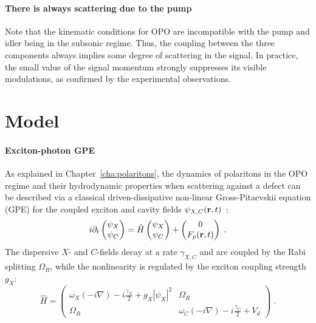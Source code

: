 \paragraph{There is always scattering due to the pump}
Note that the kinematic conditions for OPO are incompatible with the
pump and idler being in the subsonic regime. Thus, the coupling
between the three components always implies some degree of scattering
in the signal. In practice, the small value of the signal momentum
strongly suppresses its visible modulations, as confirmed by the
experimental observations.

\section{Model}
\label{sec:model-opo}

\paragraph{Exciton-photon GPE}
As explained in Chapter~\ref{cha:polaritons}, the dynamics of
polaritons in the OPO regime and their hydrodynamic properties when
scattering against a defect can be described via a classical
driven-dissipative non-linear Gross-Pitaevskii equation (GPE) for the
coupled exciton and cavity fields
$\psi_{X,C} (\mathbf{r},t)$~\cite{Whittaker_2005,Carusotto_2013}:
%
\begin{equation}
  i\partial_t \begin{pmatrix} \psi_X \\ \psi_C \end{pmatrix} =
  \hat{H} \begin{pmatrix} \psi_X \\ \psi_C \end{pmatrix}
  + \begin{pmatrix} 0 \\ F_p(\mathbf{r},t) \end{pmatrix} \; .
\label{eq:gpequ}
\end{equation}
%
The dispersive $X$- and $C$-fields decay at a rate $\gamma_{X,C}$ and
are coupled by the Rabi splitting $\Omega_R$, while the nonlinearity
is regulated by the exciton coupling strength $g_X$:
%
\begin{equation}
  \hat{H} = \begin{pmatrix} \omega_{X}(-i\nabla) - i
    \frac{\gamma_X}{2} + g_X |\psi_X|^2 & \Omega_R \\ \Omega_R &
    \omega_C(-i\nabla) - i \frac{\gamma_C}{2} + V_d \end{pmatrix} \;
  .
\end{equation}
